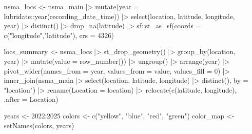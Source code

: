 \documentclass[
  letterpaper,
  DIV=11,
  numbers=noendperiod,
  oneside]{scrartcl}
\newenvironment{Shaded}{\begin{snugshade}}{\end{snugshade}}
\newcommand{\AttributeTok}[1]{\textcolor[rgb]{0.40,0.45,0.13}{#1}}
\newcommand{\DecValTok}[1]{\textcolor[rgb]{0.68,0.00,0.00}{#1}}
\newcommand{\FunctionTok}[1]{\textcolor[rgb]{0.28,0.35,0.67}{#1}}
\newcommand{\NormalTok}[1]{\textcolor[rgb]{0.00,0.23,0.31}{#1}}
\newcommand{\OtherTok}[1]{\textcolor[rgb]{0.00,0.23,0.31}{#1}}
\newcommand{\SpecialCharTok}[1]{\textcolor[rgb]{0.37,0.37,0.37}{#1}}
\newcommand{\StringTok}[1]{\textcolor[rgb]{0.13,0.47,0.30}{#1}}
\begin{document}
\begin{Shaded}
\begin{Highlighting}[]
\NormalTok{nsma\_locs }\OtherTok{\textless{}{-}}\NormalTok{ nsma\_main }\SpecialCharTok{|\textgreater{}}
  \FunctionTok{mutate}\NormalTok{(}\AttributeTok{year =}\NormalTok{ lubridate}\SpecialCharTok{::}\FunctionTok{year}\NormalTok{(recording\_date\_time)) }\SpecialCharTok{|\textgreater{}}
  \FunctionTok{select}\NormalTok{(location, latitude, longitude, year) }\SpecialCharTok{|\textgreater{}}
  \FunctionTok{distinct}\NormalTok{() }\SpecialCharTok{|\textgreater{}}
  \FunctionTok{drop\_na}\NormalTok{(latitude) }\SpecialCharTok{|\textgreater{}}
\NormalTok{  sf}\SpecialCharTok{::}\FunctionTok{st\_as\_sf}\NormalTok{(}\AttributeTok{coords =} \FunctionTok{c}\NormalTok{(}\StringTok{"longitude"}\NormalTok{,}\StringTok{"latitude"}\NormalTok{), }\AttributeTok{crs =} \DecValTok{4326}\NormalTok{)}

\NormalTok{locs\_summary }\OtherTok{\textless{}{-}}\NormalTok{ nsma\_locs }\SpecialCharTok{|\textgreater{}}
  \FunctionTok{st\_drop\_geometry}\NormalTok{() }\SpecialCharTok{|\textgreater{}}
  \FunctionTok{group\_by}\NormalTok{(location, year) }\SpecialCharTok{|\textgreater{}}
  \FunctionTok{mutate}\NormalTok{(}\AttributeTok{value =} \FunctionTok{row\_number}\NormalTok{()) }\SpecialCharTok{|\textgreater{}}
  \FunctionTok{ungroup}\NormalTok{() }\SpecialCharTok{|\textgreater{}}
  \FunctionTok{arrange}\NormalTok{(year) }\SpecialCharTok{|\textgreater{}}
  \FunctionTok{pivot\_wider}\NormalTok{(}\AttributeTok{names\_from =}\NormalTok{ year, }\AttributeTok{values\_from =}\NormalTok{ value, }\AttributeTok{values\_fill =} \DecValTok{0}\NormalTok{) }\SpecialCharTok{|\textgreater{}}
  \FunctionTok{inner\_join}\NormalTok{(nsma\_main }\SpecialCharTok{|\textgreater{}} \FunctionTok{select}\NormalTok{(location, latitude, longitude) }\SpecialCharTok{|\textgreater{}} \FunctionTok{distinct}\NormalTok{(), }\AttributeTok{by =} \StringTok{"location"}\NormalTok{) }\SpecialCharTok{|\textgreater{}}
  \FunctionTok{rename}\NormalTok{(}\StringTok{\textquotesingle{}Location\textquotesingle{}} \OtherTok{=}\NormalTok{ location) }\SpecialCharTok{|\textgreater{}}
  \FunctionTok{relocate}\NormalTok{(}\FunctionTok{c}\NormalTok{(latitude, longitude), }\AttributeTok{.after =}\NormalTok{ Location)}

\NormalTok{years }\OtherTok{\textless{}{-}} \DecValTok{2022}\SpecialCharTok{:}\DecValTok{2025}
\NormalTok{colors }\OtherTok{\textless{}{-}} \FunctionTok{c}\NormalTok{(}\StringTok{"yellow"}\NormalTok{, }\StringTok{"blue"}\NormalTok{, }\StringTok{"red"}\NormalTok{, }\StringTok{"green"}\NormalTok{)}
\NormalTok{color\_map }\OtherTok{\textless{}{-}} \FunctionTok{setNames}\NormalTok{(colors, years)}


\end{Highlighting}
\end{Shaded}
\end{document}

